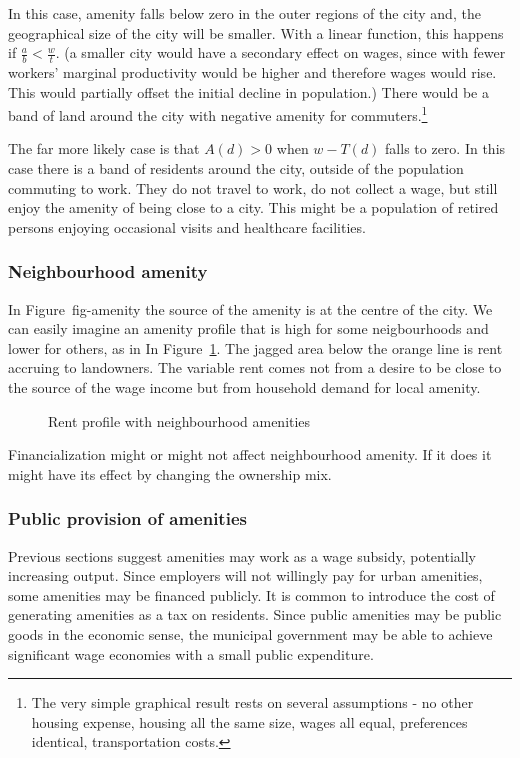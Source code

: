 In this case, amenity falls below zero in the outer regions of the city and, the geographical size of the city will be smaller. With a linear function, this happens if $\frac{a}{b} < \frac{w}{t}$. (a smaller city would have a secondary effect on wages, since with fewer workers' marginal productivity would be higher and therefore wages would rise. This would partially offset the initial decline in population.)
There would be a band of land around the city with negative amenity for commuters.\footnote{The very simple graphical result rests on several assumptions - no other housing expense, housing all the same size, wages all equal, preferences identical, transportation costs.}

The far more likely case is that $A(d) > 0$ when $w-T(d)$ falls to zero. In this case there is a band of residents around the city, outside of the population commuting to work. They do not travel to work,  do not collect a wage, but still enjoy the amenity of being close to a city. This might be a population of retired persons enjoying occasional visits and healthcare facilities.


\subsubsection{Neighbourhood amenity}
In Figure~{fig-amenity} the source of the amenity is at the centre of the city. We can easily imagine an amenity profile that is high for some neigbourhoods and lower for others, as in  In Figure~\ref{fig-amenity2}. The jagged area below the orange line is rent accruing to landowners. The variable rent comes not from a desire to be close to the source of the wage income but from household demand for local amenity.  
\begin{figure}[tb]
\begin{center}

\end{center}
\caption{Rent profile with neighbourhood amenities}
\label{fig-amenity2}
\end{figure}
Financialization might or might not affect neighbourhood amenity. If it does it might have its effect by changing the ownership mix.

\subsubsection{Public provision of amenities}

Previous sections suggest amenities may work as a wage subsidy, potentially increasing output. Since employers will not willingly pay for urban amenities, some amenities may be financed publicly. It is common to introduce the cost of generating amenities as a tax on residents.  Since public amenities may be \glspl{public good} in the economic sense, the municipal government may be able to achieve significant wage economies with a small public expenditure.


